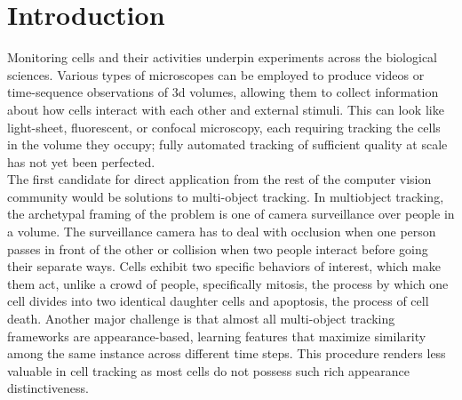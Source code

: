 \section{Introduction}
\label{sec:intro}


Monitoring cells and their activities underpin experiments across the biological sciences.  Various types of microscopes can be employed to produce videos or time-sequence observations of 3d volumes, allowing them to collect information about how cells interact with each other and external stimuli.  This can look like light-sheet, fluorescent, or confocal microscopy, each requiring tracking the cells in the volume they occupy; fully automated tracking of sufficient quality at scale has not yet been perfected.\\

The first candidate for direct application from the rest of the computer vision community would be solutions to multi-object tracking.  In multiobject tracking, the archetypal framing of the problem is one of camera surveillance over people in a volume.  The surveillance camera has to deal with occlusion when one person passes in front of the other or collision when two people interact before going their separate ways.  Cells exhibit two specific behaviors of interest, which make them act, unlike a crowd of people, specifically mitosis, the process by which one cell divides into two identical daughter cells and apoptosis, the process of cell death. Another major challenge is that almost all multi-object tracking frameworks are appearance-based, learning features that maximize similarity among the same instance across different time steps. This procedure renders less valuable in cell tracking as most cells do not possess such rich appearance distinctiveness. \\

